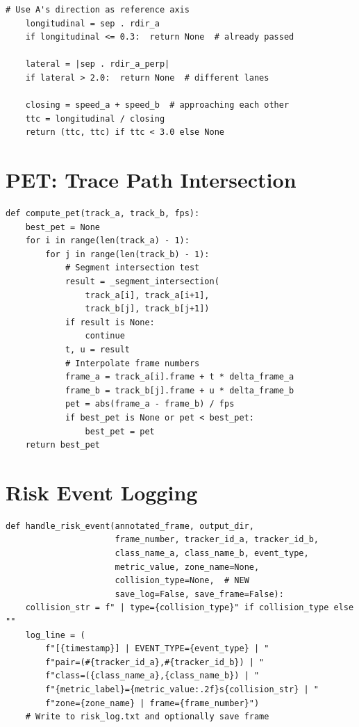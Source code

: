 \documentclass[12pt]{report}
\begin{document}
\begin{appendices}
\begin{lstlisting}[caption={TTC for head-on scenario},label={lst:ttc_headon}]
    # Use A's direction as reference axis
    longitudinal = sep . rdir_a
    if longitudinal <= 0.3:  return None  # already passed

    lateral = |sep . rdir_a_perp|
    if lateral > 2.0:  return None  # different lanes

    closing = speed_a + speed_b  # approaching each other
    ttc = longitudinal / closing
    return (ttc, ttc) if ttc < 3.0 else None
\end{lstlisting}

\section{PET: Trace Path Intersection}
\begin{lstlisting}[caption={Post Encroachment Time from historical trace paths},label={lst:pet}]
def compute_pet(track_a, track_b, fps):
    best_pet = None
    for i in range(len(track_a) - 1):
        for j in range(len(track_b) - 1):
            # Segment intersection test
            result = _segment_intersection(
                track_a[i], track_a[i+1],
                track_b[j], track_b[j+1])
            if result is None:
                continue
            t, u = result
            # Interpolate frame numbers
            frame_a = track_a[i].frame + t * delta_frame_a
            frame_b = track_b[j].frame + u * delta_frame_b
            pet = abs(frame_a - frame_b) / fps
            if best_pet is None or pet < best_pet:
                best_pet = pet
    return best_pet
\end{lstlisting}

\section{Risk Event Logging}
\begin{lstlisting}[caption={Structured risk event logging with collision type},label={lst:risk_log}]
def handle_risk_event(annotated_frame, output_dir,
                      frame_number, tracker_id_a, tracker_id_b,
                      class_name_a, class_name_b, event_type,
                      metric_value, zone_name=None,
                      collision_type=None,  # NEW
                      save_log=False, save_frame=False):
    collision_str = f" | type={collision_type}" if collision_type else ""
    log_line = (
        f"[{timestamp}] | EVENT_TYPE={event_type} | "
        f"pair=(#{tracker_id_a},#{tracker_id_b}) | "
        f"class=({class_name_a},{class_name_b}) | "
        f"{metric_label}={metric_value:.2f}s{collision_str} | "
        f"zone={zone_name} | frame={frame_number}")
    # Write to risk_log.txt and optionally save frame
\end{lstlisting}


\end{appendices}
\end{document}
